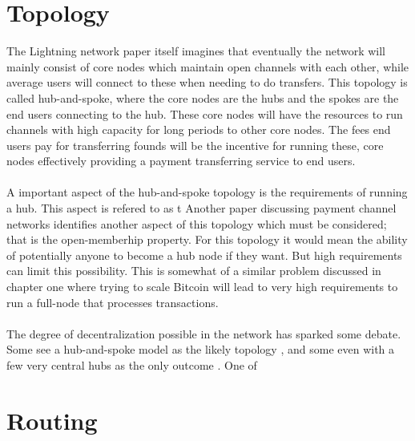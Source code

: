 \documentclass[informationsecurity]{gucmasterproject}
\begin{document}
\section{Topology}
The Lightning network paper itself\cite{poon2015bitcoin} imagines that eventually the network will mainly consist of core nodes which maintain open channels with each other, while average users will connect to these when needing to do transfers. This topology is called hub-and-spoke, where the core nodes are the hubs and the spokes are the end users connecting to the hub. These core nodes will have the resources to run channels with high capacity for long periods to other core nodes. The fees end users pay for transferring founds will be the incentive for running these, core nodes effectively providing a payment transferring service to end users. 

\paragraph{}
A important aspect of the hub-and-spoke topology is the requirements of running a hub.
This aspect is refered to as t
Another paper discussing payment channel networks\cite{mccorry2016towards} identifies another aspect of this topology which must be considered; that is the open-memberhip property.
For this topology it would mean the ability of potentially anyone to become a hub node if they want.
But high requirements can limit this possibility.
This is somewhat of a similar problem discussed in chapter one where trying to scale Bitcoin will lead to very high requirements to run a full-node that processes transactions.


\paragraph{}
The degree of decentralization possible in the network has sparked some debate. Some see a hub-and-spoke model as the likely topology \cite{sceptic1}, and some even with a few very central hubs as the only outcome \cite{sceptic2}. One of 


\section{Routing}
\end{document}
